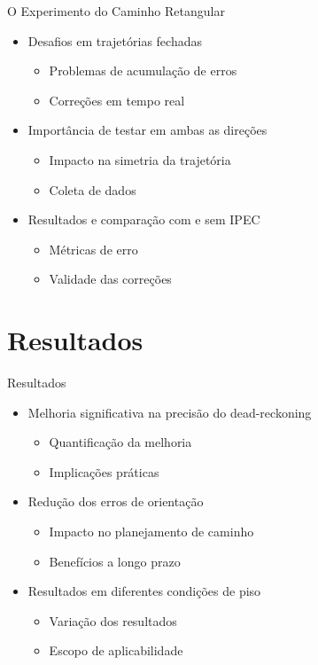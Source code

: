 \documentclass[xcolor=dvipsnames, aspectratio=169]{beamer}
\begin{document}
\begin{frame}{O Experimento do Caminho Retangular}
  \begin{itemize}
    \item Desafios em trajetórias fechadas
      \begin{itemize}
        \item Problemas de acumulação de erros
        \item Correções em tempo real
      \end{itemize}
    \item Importância de testar em ambas as direções
      \begin{itemize}
        \item Impacto na simetria da trajetória
        \item Coleta de dados
      \end{itemize}
    \item Resultados e comparação com e sem IPEC
      \begin{itemize}
        \item Métricas de erro
        \item Validade das correções
      \end{itemize}
  \end{itemize}
\end{frame}

\section{Resultados}
\begin{frame}{Resultados}
  \begin{itemize}
    \item Melhoria significativa na precisão do dead-reckoning
      \begin{itemize}
        \item Quantificação da melhoria
        \item Implicações práticas
      \end{itemize}
    \item Redução dos erros de orientação
      \begin{itemize}
        \item Impacto no planejamento de caminho
        \item Benefícios a longo prazo
      \end{itemize}
    \item Resultados em diferentes condições de piso
      \begin{itemize}
        \item Variação dos resultados
        \item Escopo de aplicabilidade
      \end{itemize}
  \end{itemize}
\end{frame}
\end{document}

